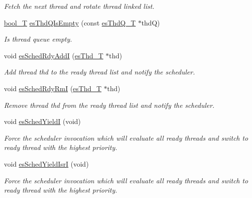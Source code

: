 \begin{DoxyCompactItemize}
\begin{DoxyCompactList}\small\item\em Fetch the next thread and rotate thread linked list. \end{DoxyCompactList}\item 
\hyperlink{group__template__compiler_ga74fbee312f9185efb602f89d21b53404}{bool\-\_\-\-T} \hyperlink{group__kern__impl_gacf2687b82ce64e2154d97fd3b69a4ab5}{es\-Thd\-Q\-Is\-Empty} (const \hyperlink{group__kern__intf_ga7a1a060699e83a01512ebb5540019556}{es\-Thd\-Q\-\_\-\-T} $\ast$thd\-Q)
\begin{DoxyCompactList}\small\item\em Is thread queue empty. \end{DoxyCompactList}\item 
void \hyperlink{group__kern__impl_ga73e14b1860ce824c822adc407aee0977}{es\-Sched\-Rdy\-Add\-I} (\hyperlink{group__kern__intf_ga62e3a3ca0a4597a19c43cb8868810d82}{es\-Thd\-\_\-\-T} $\ast$thd)
\begin{DoxyCompactList}\small\item\em Add thread {\ttfamily thd} to the ready thread list and notify the scheduler. \end{DoxyCompactList}\item 
void \hyperlink{group__kern__impl_ga0b8263c5024ebb59cd9b95cc9253b44d}{es\-Sched\-Rdy\-Rm\-I} (\hyperlink{group__kern__intf_ga62e3a3ca0a4597a19c43cb8868810d82}{es\-Thd\-\_\-\-T} $\ast$thd)
\begin{DoxyCompactList}\small\item\em Remove thread {\ttfamily thd} from the ready thread list and notify the scheduler. \end{DoxyCompactList}\item 
void \hyperlink{group__kern__impl_gaf90e487bfce974dafaeed5009e189810}{es\-Sched\-Yield\-I} (void)
\begin{DoxyCompactList}\small\item\em Force the scheduler invocation which will evaluate all ready threads and switch to ready thread with the highest priority. \end{DoxyCompactList}\item 
void \hyperlink{group__kern__impl_gafbea29b376b29f11bbfc48a0f5144e9a}{es\-Sched\-Yield\-Isr\-I} (void)
\begin{DoxyCompactList}\small\item\em Force the scheduler invocation which will evaluate all ready threads and switch to ready thread with the highest priority. \end{DoxyCompactList}\item 

\end{DoxyCompactItemize}
